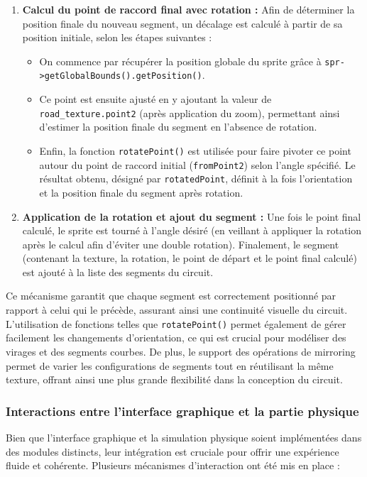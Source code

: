 \begin{enumerate}
    \item \textbf{Calcul du point de raccord final avec rotation :}
    Afin de déterminer la position finale du nouveau segment, un décalage est calculé à partir de sa position initiale, selon les étapes suivantes :
    \begin{itemize}
        \item On commence par récupérer la position globale du \gls{sprite} grâce à \texttt{spr->getGlobalBounds().getPosition()}.
        \item Ce point est ensuite ajusté en y ajoutant la valeur de \texttt{road\_texture.point2} (après application du zoom), permettant ainsi d'estimer la position finale du segment en l'absence de rotation.
        \item Enfin, la fonction \texttt{rotatePoint()} est utilisée pour faire pivoter ce point autour du point de raccord initial (\texttt{fromPoint2}) selon l'angle spécifié.
        Le résultat obtenu, désigné par \texttt{rotatedPoint}, définit à la fois l'orientation et la position finale du segment après rotation.
    \end{itemize}

    \item \textbf{Application de la rotation et ajout du segment :}
    Une fois le point final calculé, le \gls{sprite} est tourné à l’angle désiré (en veillant à appliquer la rotation après le calcul afin d’éviter une double rotation).
    Finalement, le segment (contenant la texture, la rotation, le point de départ et le point final calculé) est ajouté à la liste des segments du circuit.
\end{enumerate}

Ce mécanisme garantit que chaque segment est correctement positionné par rapport à celui qui le précède, assurant ainsi une continuité visuelle du circuit.
L'utilisation de fonctions telles que \texttt{rotatePoint()} permet également de gérer facilement les changements d'orientation, ce qui est crucial pour modéliser des virages et des segments courbes.
De plus, le support des opérations de mirroring permet de varier les configurations de segments tout en réutilisant la même texture, offrant ainsi une plus grande flexibilité dans la conception du circuit.


\subsubsection{Interactions entre l'interface graphique et la partie physique}\label{subsubsec:interactions-entre-l-interface-graphique-et-la-partie-physique}
Bien que l'interface graphique et la simulation physique soient implémentées dans des modules distincts, leur intégration est cruciale pour offrir une expérience fluide et cohérente.
Plusieurs mécanismes d'interaction ont été mis en place :

